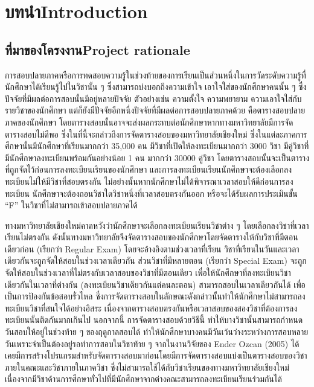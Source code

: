 \chapter{\ifcpe บทนำ\else Introduction\fi}

\section{\ifcpe ที่มาของโครงงาน\else Project rationale\fi}
\label{sec:Project rationale}


การสอบปลายภาคหรือการทดสอบความรู้ในช่วงท้ายของการเรียนเป็นส่วนหนึ่งในการวัดระดับความรู้ที่นักศึกษาได้เรียนรู้ไปในวิชานั้น ๆ
ซึ่งสามารถบ่งบอกถึงความเข้าใจ เอาใจใส่ของนักศึกษาคนนั้น ๆ ซึ่งปัจจัยที่มีผลต่อการสอบนั้นมีอยู่หลายปัจจัย
ตัวอย่างเช่น ความตั้งใจ ความพยายาม ความเอาใจใส่กับรายวิชาของนักศึกษา
แต่ก็ยังมีปัจจัยอีกหนึ่งปัจจัยที่มีผลต่อการสอบปลายภาคด้วย คือตารางสอบปลายภาคของนักศึกษา
โดยตารางสอบนั้นอาจจะส่งผลกระทบต่อนักศึกษาหากทางมหาวิทยาลัยมีการจัดตารางสอบไม่ดีพอ
ซึ่งในที่นี้จะกล่าวถึงการจัดตารางสอบของมหาวิทยาลัยเชียงใหม่ ซึ่งในแต่ละภาคการศึกษานั้นมีนักศึกษาที่เรียนมากกว่า 35,000 คน 
มีวิชาที่เปิดให้ลงทะเบียนมากกว่า 3000 วิชา มีคู่วิชาที่มีนักศึกษาลงทะเบียนพร้อมกันอย่างน้อย 1 คน มากกว่า 30000 คู่วิชา 
โดยตารางสอบนั้นจะเป็นตารางที่ถูกจัดไว้ก่อนการลงทะเบียนเรียนของนักศึกษา 
และการลงทะเบียนเรียนนักศึกษาจะต้องเลือกลงทะเบียนไม่ให้มีวิชาที่สอบตรงกัน
ไม่อย่างนั้นหากนักศึกษาไม่ได้พิจารณาเวลาสอบให้ดีก่อนการลงทะเบียน นักศึกษาจะต้องถอนวิชาใดวิชาหนึ่งที่เวลาสอบตรงกันออก
หรือจะได้รับผลการประเมินขั้น ``F'' ในวิชาที่ไม่สามารถเข้าสอบปลายภาคได้


ทางมหาวิทยาลัยเชียงใหม่คาดหวังว่านักศึกษาจะเลือกลงทะเบียนเรียนวิชาต่าง ๆ
โดยเลือกลงวิชาที่เวลาเรียนไม่ตรงกัน ดังนั้นทางมหาวิทยาลัยจึงจัดตารางสอบของนักศึกษาโดยจัดตารางให้กับวิชาที่มีตอนเดียวก่อน
(เรียกว่า Regular Exam) โดยจะอ้างอิงตามช่วงเวลาที่เรียน วิชาที่เรียนในวันและเวลาเดียวกันจะถูกจัดให้สอบในช่วงเวลาเดียวกัน
ส่วนวิชาที่มีหลายตอน (เรียกว่า Special Exam) จะถูกจัดให้สอบในช่วงเวลาที่ไม่ตรงกับเวลาสอบของวิชาที่มีตอนเดียว
เพื่อให้นักศึกษาที่ลงทะเบียนวิชาเดียวกันในเวลาที่ต่างกัน  (ลงทะเบียนวิชาเดียวกันแต่คนละตอน) สามารถสอบในเวลาเดียวกันได้
เพื่อเป็นการป้องกันข้อสอบรั่วไหล ซึ่งการจัดตารางสอบในลักษณะดังกล่าวนั้นทําให้นักศึกษาไม่สามารถลงทะเบียนวิชาที่สนใจได้อย่างอิสระ
เนื่องจากตารางสอบตรงกันหรือเวลาสอบของสองวิชาที่ต้องการลงทะเบียนนั้นติดกันมากเกินไป 
นอกจากนี้ การจัดตารางสอบด้วยวิธีนี้ ทำให้บางวิชานั้นสามารถกําหนดวันสอบให้อยู่ในช่วงท้าย ๆ ของฤดูกาลสอบได้ 
ทําให้นักศึกษาบางคนมีวันเว้นว่างระหว่างการสอบหลายวันเพราะจําเป็นต้องอยู่รอทำการสอบในวิชาท้าย ๆ
จากในงานวิจัยของ Ender Ozcan (2005) ได้เคยมีการสร้างโปรแกรมสำหรับจัดตารางสอบมาก่อนโดยมีการจัดตารางสอบแบ่งเป็นตารางสอบของวิชาภายในคณะและวิชาภายในภาควิชา 
ซึ่งไม่สามารถใช้ได้กับวิชาเรียนของทางมหาวิทยาลัยเชียงใหม่ 
เนื่องจากมีวิชาด้านการศึกษาทั่วไปที่มีนักศึกษาจากต่างคณะสามารถลงทะเบียนเรียนร่วมกันได้


